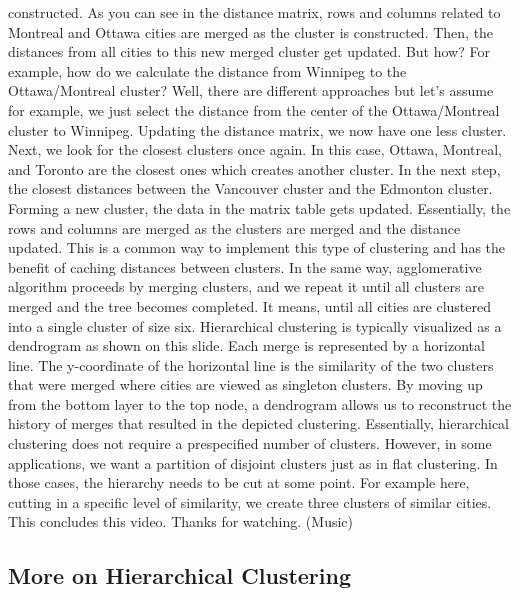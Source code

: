 constructed. As you can see in the distance matrix, rows and columns related to Montreal and Ottawa cities are merged as the cluster is constructed. Then, the distances from all cities to this new merged cluster get updated. But how? For example, how do we calculate the distance from Winnipeg to the Ottawa/Montreal cluster? Well, there are different approaches but let's assume for example, we just select the distance from the center of the Ottawa/Montreal cluster to Winnipeg. Updating the distance matrix, we now have one less cluster. Next, we look for the closest clusters once again. In this case, Ottawa, Montreal, and Toronto are the closest ones which creates another cluster. In the next step, the closest distances between the Vancouver cluster and the Edmonton cluster. Forming a new cluster, the data in the matrix table gets updated. Essentially, the rows and columns are merged as the clusters are merged and the distance updated. This is a common way to implement this type of clustering and has the benefit of caching distances between clusters. In the same way, agglomerative algorithm proceeds by merging clusters, and we repeat it until all clusters are merged and the tree becomes completed. It means, until all cities are clustered into a single cluster of size six. Hierarchical clustering is typically visualized as a dendrogram as shown on this slide. Each merge is represented by a horizontal line. The y-coordinate of the horizontal line is the similarity of the two clusters that were merged where cities are viewed as singleton clusters. By moving up from the bottom layer to the top node, a dendrogram allows us to reconstruct the history of merges that resulted in the depicted clustering. Essentially, hierarchical clustering does not require a prespecified number of clusters. However, in some applications, we want a partition of disjoint clusters just as in flat clustering. In those cases, the hierarchy needs to be cut at some point. For example here, cutting in a specific level of similarity, we create three clusters of similar cities. This concludes this video. Thanks for watching. (Music)

\subsection{More on Hierarchical Clustering}


